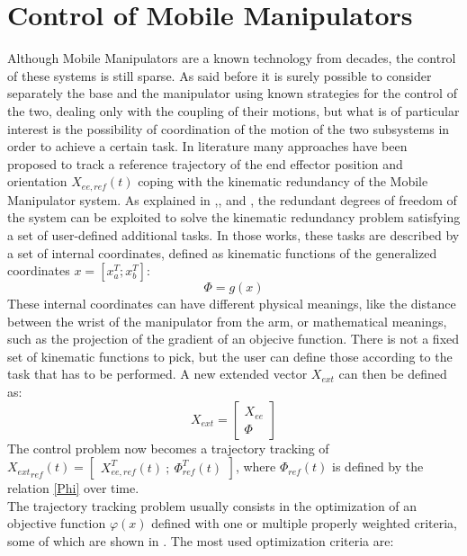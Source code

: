 \section{Control of Mobile Manipulators}
Although Mobile Manipulators are a known technology from decades, the control of these systems is still sparse. As said before it is surely possible to consider separately the base and the manipulator using known strategies for the control of the two, dealing only with the coupling of their motions, but what is of particular interest is the possibility of coordination of the motion of the two subsystems in order to achieve a certain task. In literature many approaches have been proposed to track a reference trajectory of the end effector position and orientation $X_{ee,ref}(t)$ coping with the kinematic redundancy of the Mobile Manipulator system. As explained in \cite{bayle},\cite{seraji1998},\cite{seraji1993} and \cite{mikschschroeder}, the redundant degrees of freedom of the system can be exploited to solve the kinematic redundancy problem satisfying a set of user-defined additional tasks. In those works, these tasks are described by a set of internal coordinates, defined as kinematic functions of the generalized coordinates $x=\left[x_a^T ; x_b^T\right]$:
\begin{equation}\label{Phi}
	\Phi=g(x)
\end{equation}
These internal coordinates can have different physical meanings, like the distance between the wrist of the manipulator from the arm, or mathematical meanings, such as the projection of the gradient of an objecive function. There is not a fixed set of kinematic functions to pick, but the user can define those according to the task that has to be performed. A new extended vector $X_{ext}$ can then be defined as:
\begin{equation}
	X_{ext}=\left[\begin{matrix}
	X_{ee} \\ \Phi
	\end{matrix}\right]
\end{equation}
The control problem now becomes a trajectory tracking of ${X_{ext}}_{ref}(t) =\left[\begin{matrix} X_{ee,ref}^T(t) \ ;\ \Phi_{ref}^T(t) \end{matrix}\right]$, where $ \Phi_{ref}(t)$ is defined by the relation \ref{Phi} over time.\\
The trajectory tracking problem usually consists in the optimization of an objective function $\varphi(x)$ defined with one or multiple properly weighted criteria, some of which are shown in \cite{multicriteria}. The most used optimization criteria are: 
